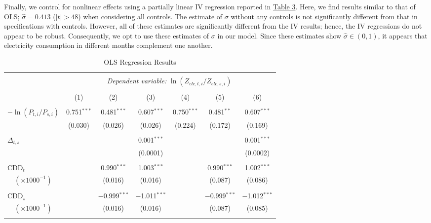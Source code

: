 \documentclass[12pt,a4paper]{extarticle}
\begin{document}
Finally, we control for nonlinear effects using a partially linear IV regression reported in \hyperref[table:3]{Table 3}. Here, we find results similar to that of OLS; $\hat{\sigma} = 0.413$ ($|t| > 48$) when considering all controls. The estimate of $\sigma$ without any controls is not significantly different from that in specifications with controls. However, all of these estimates are significantly different from the IV results; hence, the IV regressions do not appear to be robust. Consequently, we opt to use these estimates of $\sigma$ in our model. Since these estimates show $\hat{\sigma} \in (0,1)$, it appears that electricity consumption in different months complement one another. 

\begin{table}[!htbp] \centering 
	\caption{OLS Regression Results}
	\label{table:1} 
	\small
	\begin{tabular}{@{\extracolsep{5pt}}lcccccc} 
		\\[-4ex]\hline  
		\hline \\[-1.8ex] 
		& \multicolumn{6}{c}{\textit{Dependent variable:} $\ln (Z_{elc, t, i} / Z_{elc, s, i})$} \\ [0.5ex]
		\cline{2-7} 
		\\[-1.8ex] & (1) & (2) & (3) & (4) & (5) & (6)\\ [0.5ex]
		\hline \\[-1.8ex] 
		$-\ln (P_{t,i} / P_{s,i})$ & 0.751$^{***}$ & 0.481$^{***}$ & 0.607$^{***}$ & 0.750$^{***}$ & 0.481$^{**}$ & 0.607$^{***}$ \\ 
		& (0.030) & (0.026) & (0.026) & (0.224) & (0.172) & (0.169) \\ 
		& & & & & & \\ 
		$\Delta_{t,s}$ &  &  & 0.001$^{***}$ &  &  & 0.001$^{***}$ \\ 
		&  &  & (0.0001) &  &  & (0.0002) \\ 
		& & & & & & \\ 
		CDD$_t$ &  & 0.990$^{***}$ & 1.003$^{***}$ &  & 0.990$^{***}$ & 1.002$^{***}$ \\ 
		$\quad(\times 1000^{-1})$&  & (0.016) & (0.016) &  & (0.087) & (0.086) \\ 
		& & & & & & \\ 
		CDD$_s$ &  & $-$0.999$^{***}$ & $-$1.011$^{***}$ &  & $-$0.999$^{***}$ & $-$1.012$^{***}$ \\ 
		$\quad(\times 1000^{-1})$&  & (0.016) & (0.016) &  & (0.087) & (0.085) \\ 
		& & & & & & \\ 

\end{tabular}
\end{table}
\end{document}
